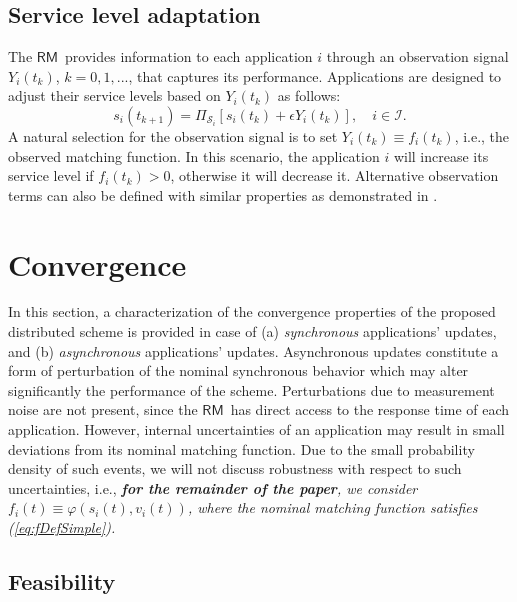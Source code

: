 \documentclass[letter,11pt]{article}
\begin{document}
\subsection{Service level adaptation}
\label{sec:AppAdjust}

The {$\mathsf{RM}$}\ provides information to each application $i$ through an observation signal $Y_i(t_k)$, $k=0,1,...$, that captures its performance. Applications are designed to adjust their service levels based on $Y_i(t_k)$ as follows: 
\begin{equation}	
\label{eq:RecursionForApplications}
 s_i(t_{k+1}) = \Pi_{\mathcal{S}_i}\left[s_i(t_k) + \epsilon Y_{i}(t_k)\right], \quad i\in\mathcal{I}.
\end{equation}
A natural selection for the observation signal is to set $Y_i(t_k)\equiv f_i(t_k)$, i.e., the observed matching function. In this scenario, the application $i$ will increase its service level if $f_i(t_k) > 0$, otherwise it will decrease it. Alternative observation terms can also be defined with similar properties as demonstrated in \cite{Cha13}. 

\section{Convergence}
\label{sec:convergence}

In this section, a characterization of the convergence properties of the proposed distributed scheme is provided in case of (a) \emph{synchronous} applications' updates, and (b) \emph{asynchronous} applications' updates. 
Asynchronous updates constitute a form of perturbation of the nominal synchronous behavior which may alter significantly the performance of the scheme. Perturbations due to measurement noise are not present, since the {$\mathsf{RM}$}\ has direct access to the response time of each application. However, internal uncertainties of an application may result in small deviations from its nominal matching function. Due to the small probability density of such events, we will not discuss robustness with respect to such uncertainties, i.e., \textit{\textbf{for the remainder of the paper}, we consider $f_i(t) \equiv \varphi(s_i(t),v_i(t))$, where the nominal matching function satisfies (\ref{eq:fDefSimple}).}

\subsection{Feasibility}
\label{sec:Feasibility}
\end{document}
